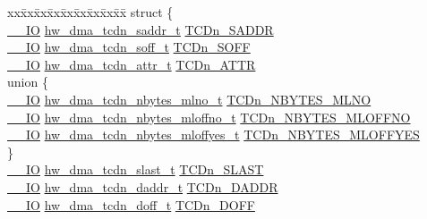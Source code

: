 \begin{DoxyCompactItemize}
\item 
\begin{tabbing}
xx\=xx\=xx\=xx\=xx\=xx\=xx\=xx\=xx\=\kill
struct \{\\
\>\hyperlink{core__sc300_8h_aec43007d9998a0a0e01faede4133d6be}{\_\_IO} \hyperlink{union__hw__dma__tcdn__saddr}{hw\_dma\_tcdn\_saddr\_t} \hyperlink{struct__hw__dma_a7e495c07dfc1c753f70291bcde93da4f}{TCDn\_SADDR}\\
\>\hyperlink{core__sc300_8h_aec43007d9998a0a0e01faede4133d6be}{\_\_IO} \hyperlink{union__hw__dma__tcdn__soff}{hw\_dma\_tcdn\_soff\_t} \hyperlink{struct__hw__dma_a097e88c2b7ed349373ed027398d5ad33}{TCDn\_SOFF}\\
\>\hyperlink{core__sc300_8h_aec43007d9998a0a0e01faede4133d6be}{\_\_IO} \hyperlink{union__hw__dma__tcdn__attr}{hw\_dma\_tcdn\_attr\_t} \hyperlink{struct__hw__dma_adfbdaf88fdea94a66b4d7655d01bb201}{TCDn\_ATTR}\\
\>union \{\\
\>\>\hyperlink{core__sc300_8h_aec43007d9998a0a0e01faede4133d6be}{\_\_IO} \hyperlink{union__hw__dma__tcdn__nbytes__mlno}{hw\_dma\_tcdn\_nbytes\_mlno\_t} \hyperlink{struct__hw__dma_af52fa369552c946d55899f5ee873bba3}{TCDn\_NBYTES\_MLNO}\\
\>\>\hyperlink{core__sc300_8h_aec43007d9998a0a0e01faede4133d6be}{\_\_IO} \hyperlink{union__hw__dma__tcdn__nbytes__mloffno}{hw\_dma\_tcdn\_nbytes\_mloffno\_t} \hyperlink{struct__hw__dma_ad5386d1a4617e61bb08041eadcb0dfe4}{TCDn\_NBYTES\_MLOFFNO}\\
\>\>\hyperlink{core__sc300_8h_aec43007d9998a0a0e01faede4133d6be}{\_\_IO} \hyperlink{union__hw__dma__tcdn__nbytes__mloffyes}{hw\_dma\_tcdn\_nbytes\_mloffyes\_t} \hyperlink{struct__hw__dma_acd53d5b5d684dc74a2b43d2666df5c15}{TCDn\_NBYTES\_MLOFFYES}\\
\>\} \hypertarget{struct__hw__dma_1_1_0D130_a890bb2138c87a4b8e54a7183f9ecde4f}{}\label{struct__hw__dma_1_1_0D130_a890bb2138c87a4b8e54a7183f9ecde4f}
\\
\>\hyperlink{core__sc300_8h_aec43007d9998a0a0e01faede4133d6be}{\_\_IO} \hyperlink{union__hw__dma__tcdn__slast}{hw\_dma\_tcdn\_slast\_t} \hyperlink{struct__hw__dma_a834468626bf806efc9412ee87d0d06f3}{TCDn\_SLAST}\\
\>\hyperlink{core__sc300_8h_aec43007d9998a0a0e01faede4133d6be}{\_\_IO} \hyperlink{union__hw__dma__tcdn__daddr}{hw\_dma\_tcdn\_daddr\_t} \hyperlink{struct__hw__dma_a46ea4c788ba8cc38fc0fdba7a91af030}{TCDn\_DADDR}\\
\>\hyperlink{core__sc300_8h_aec43007d9998a0a0e01faede4133d6be}{\_\_IO} \hyperlink{union__hw__dma__tcdn__doff}{hw\_dma\_tcdn\_doff\_t} \hyperlink{struct__hw__dma_a481bd0bb06736725200f36022b1928da}{TCDn\_DOFF}\\

\end{tabbing}
\end{DoxyCompactItemize}
